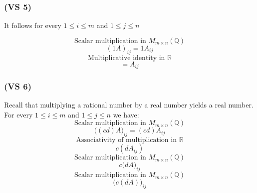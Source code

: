 \documentclass{article}
\begin{document}
\subsubsection*{(VS 5)}

It follows for every \(1 \leq i \leq m\) and \(1 \leq j \leq n\)

\begin{equation*}
    \text{Scalar multiplication in \(M_{m \times n}(\mathbb{Q})\)}
\end{equation*}
\begin{equation*}
    (1A)_{ij} = 1A_{ij} 
\end{equation*}
\begin{equation*}
    \text{Multiplicative identity in \(\mathbb{R}\)}
\end{equation*}
\begin{equation*}
    = A_{ij}
\end{equation*}

\subsubsection*{(VS 6)}
Recall that multiplying a rational number by a real number yields a real number.
For every \(1 \leq i \leq m\) and \(1 \leq j \leq n\) we have:
\begin{equation*}
    \text{Scalar multiplication in \(M_{m \times n}(\mathbb{Q})\)}
\end{equation*}
\begin{equation*}
    \Big((cd)A\Big)_{ij} = (cd)A_{ij}
\end{equation*}
\begin{equation*}
    \text{Associativity of multiplication in \(\mathbb{R}\)}
\end{equation*}
\begin{equation*}
    c(dA_{ij})
\end{equation*}
\begin{equation*}
    \text{Scalar multiplication in \(M_{m \times n}(\mathbb{Q})\)}
\end{equation*}
\begin{equation*}
    c\Big(dA\Big)_{ij}
\end{equation*}
\begin{equation*}
    \text{Scalar multiplication in \(M_{m \times n}(\mathbb{Q})\)}
\end{equation*}
\begin{equation*}
    \Big(c(dA)\Big)_{ij}
\end{equation*}
\end{document}

